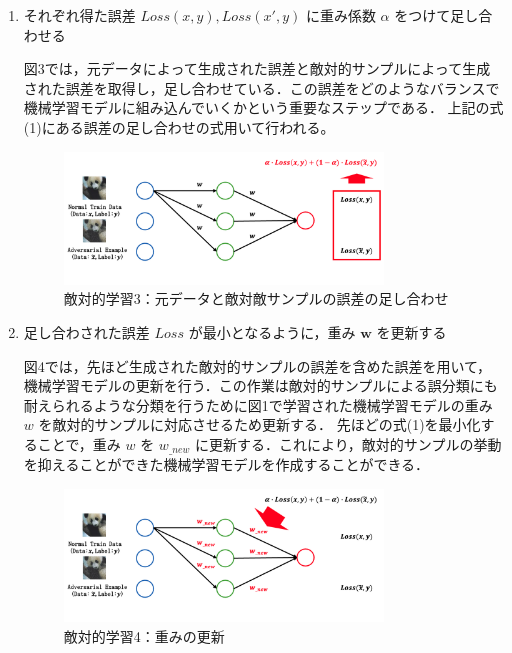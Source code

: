 \begin{enumerate}
    \item それぞれ得た誤差 $Loss(x, y), Loss(x', y)$ に重み係数 $\alpha$ をつけて足し合わせる

    図3では，元データによって生成された誤差と敵対的サンプルによって生成された誤差を取得し，足し合わせている．この誤差をどのようなバランスで機械学習モデルに組み込んでいくかという重要なステップである． 上記の式(1)にある誤差の足し合わせの式用いて行われる。
    
    \begin{figure}[H]
        \centering
        \includegraphics[width=0.8\textwidth]{images/敵対的学習3.png}
        \caption{敵対的学習3：元データと敵対敵サンプルの誤差の足し合わせ}
        \label{fig:adversarial_learning3}
    \end{figure}

    \item 足し合わされた誤差 $Loss$ が最小となるように，重み $\bm{w}$ を更新する

    図4では，先ほど生成された敵対的サンプルの誤差を含めた誤差を用いて，機械学習モデルの更新を行う．この作業は敵対的サンプルによる誤分類にも耐えられるような分類を行うために図1で学習された機械学習モデルの重み $w$ を敵対的サンプルに対応させるため更新する．
    先ほどの式(1)を最小化することで，重み $w$ を $w_{\_new}$ に更新する．これにより，敵対的サンプルの挙動を抑えることができた機械学習モデルを作成することができる．
    
    \begin{figure}[H]
        \centering
        \includegraphics[width=0.8\textwidth]{images/敵対的学習4.png}
        \caption{敵対的学習4：重みの更新}
        \label{fig:adversarial_learning4}
    \end{figure}

\end{enumerate}

